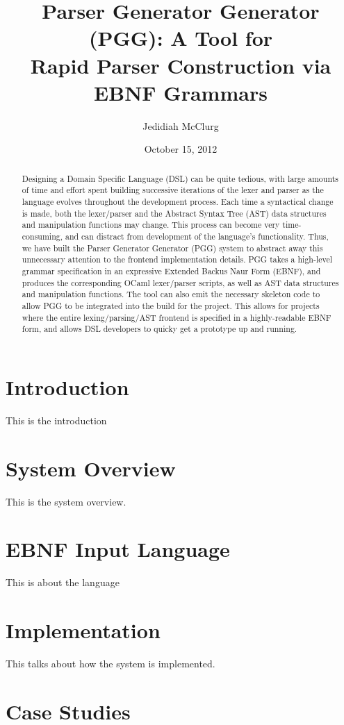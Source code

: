 \documentclass[10pt]{article}
\title{Parser Generator Generator (PGG): A Tool for \\ Rapid Parser Construction via EBNF Grammars}
\author{Jedidiah McClurg}
\date{October 15, 2012}
\begin{document}
\maketitle

\begin{abstract}
Designing a Domain Specific Language (DSL) can be quite tedious,
with large amounts of time and effort spent building successive
iterations of the lexer and parser as the language evolves
throughout the development process.
Each time a syntactical change is made, both the lexer/parser and
the Abstract Syntax Tree (AST) data structures and manipulation
functions may change.  This process can become very
time-consuming, and can distract from development of the
language's functionality.  Thus, we have built the Parser
Generator Generator (PGG) system to abstract away this unnecessary
attention to the frontend implementation details.  PGG takes a high-level
grammar specification in an expressive Extended Backus Naur Form (EBNF),
and produces the corresponding OCaml lexer/parser scripts, as
well as AST data structures and manipulation functions.  The
tool can also emit the necessary skeleton code to allow
PGG to be integrated into the build for the project.  This
allows for projects where the entire lexing/parsing/AST
frontend is specified in a highly-readable EBNF form,
and allows DSL developers to quicky get a prototype up and running.
\end{abstract}

\section{Introduction}
This is the introduction

\section{System Overview}
This is the system overview.

\section{EBNF Input Language}
This is about the language

\section{Implementation}
This talks about how the system is implemented.

\section{Case Studies}
\end{document}

